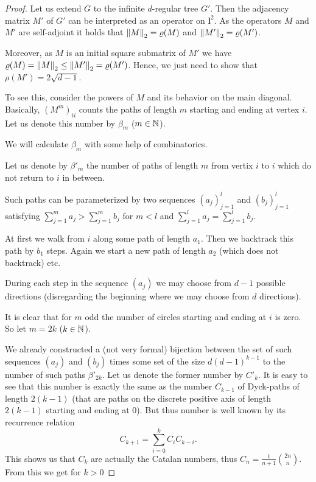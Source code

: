 \documentclass{article}
\begin{document}
\begin{proof}
Let us extend $G$ to the infinite $d$-regular tree $G'$. Then the adjacency matrix $M'$ of $G'$ can be interpreted as an operator on $\boldsymbol{l}^2$. As the operators $M$ and $M'$ are self-adjoint it holds that $\left\Vert M \right\Vert_2=\varrho(M)$ and $\left\Vert M' \right\Vert_2=\varrho(M')$. 

Moreover, as $M$ is an initial square submatrix of $M'$ we have $\varrho(M)=\left\Vert M \right\Vert_2\leq\left\Vert M' \right\Vert_2=\varrho(M')$. Hence, we just need to show that $\rho(M')=2\sqrt{d-1}$.

To see this, consider the powers of $M$ and its behavior on the main diagonal.
Basically, $(M^m)_{ii}$ counts the paths of length $m$ starting and ending at vertex $i$. Let us denote this number by $\beta_m$ ($m\in\mathbb{N}$).

We will calculate $\beta_m$ with some help of combinatorics.

Let us denote by $\beta'_m$ the number of paths of length $m$ from vertix $i$ to $i$ which do not return to $i$ in between.

Such paths can be parameterized by two sequences $(a_j)_{j=1}^l$ and $(b_j)_{j=1}^l$ satisfying $\sum_{j=1}^m{a_j}>\sum_{j=1}^m{b_j}$ for $m<l$ and $\sum_{j=1}^l{a_j}=\sum_{j=1}^l{b_j}$.

At first we walk from $i$ along some path of length $a_1$. Then we backtrack this path by $b_1$ steps. Again we start a new path of length $a_2$ (which does not backtrack) etc.

During each step in the sequence $(a_j)$ we may choose from $d-1$ possible directions (disregarding the beginning where we may choose from $d$ directions).

It is clear that for $m$ odd the number of circles starting and ending at $i$ is zero. So let $m=2k$ ($k\in\mathbb{N}$).

We already constructed a (not very formal) bijection between the set of such sequences $(a_j)$ and $(b_j)$ times some set of the size $d(d-1)^{k-1}$ to the number of such paths $\beta'_{2k}$. Let us denote the former number by $C'_k$. It is easy to see that this number is exactly the same as the number $C_{k-1}$ of Dyck-paths of length $2(k-1)$ (that are paths  on the discrete positive axis of length $2(k-1)$ starting and ending at $0$).
But thus number is well known by its recurrence relation
\begin{equation}
C_{k+1}=\sum_{i=0}^k{C_iC_{k-i}}\text{.}
\end{equation}
This shows us that $C_k$ are actually the Catalan numbers, thus $C_n=\frac{1}{n+1}{2n \choose n}$.
From this we get for $k>0$


\end{proof}
\end{document}
